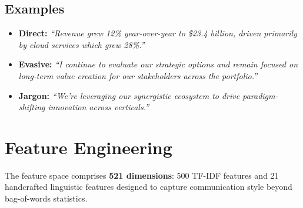 \documentclass[12pt]{article}
\begin{document}
\subsection{Examples}

\begin{itemize}[nosep]
    \item \textbf{Direct:} \emph{``Revenue grew 12\% year-over-year to
          \$23.4 billion, driven primarily by cloud services which grew
          28\%.''}
    \item \textbf{Evasive:} \emph{``I continue to evaluate our strategic
          options and remain focused on long-term value creation for our
          stakeholders across the portfolio.''}
    \item \textbf{Jargon:} \emph{``We're leveraging our synergistic
          ecosystem to drive paradigm-shifting innovation across
          verticals.''}
\end{itemize}

\section{Feature Engineering}
\label{sec:features}

The feature space comprises \textbf{521 dimensions}: 500 TF-IDF features and
21 handcrafted linguistic features designed to capture communication style
beyond bag-of-words statistics.
\end{document}
